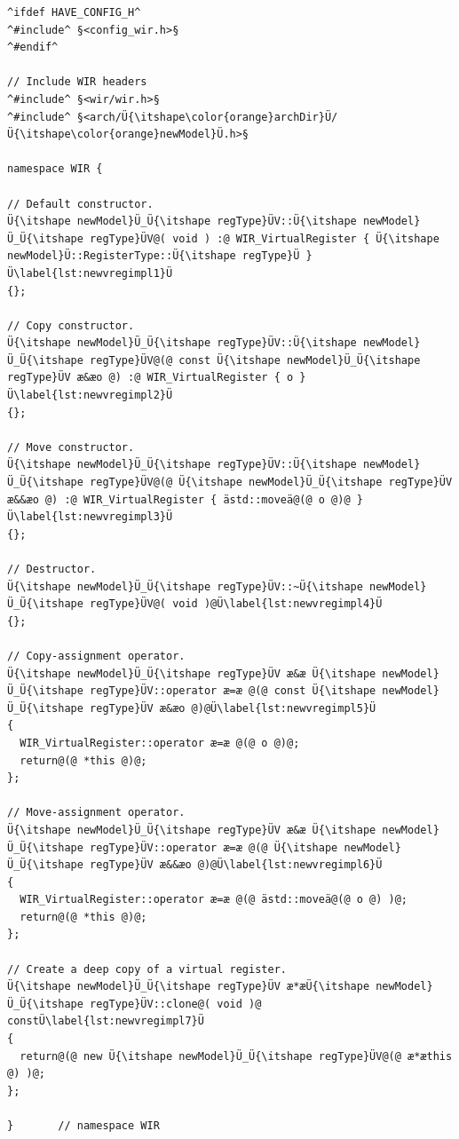 \begin{lstlisting}[style=code,float=!t,caption={Implementation of a New Virtual Register's Class},label=lst:newvregimpl]
^ifdef HAVE_CONFIG_H^
^#include^ §<config_wir.h>§
^#endif^

// Include WIR headers
^#include^ §<wir/wir.h>§
^#include^ §<arch/Ü{\itshape\color{orange}archDir}Ü/Ü{\itshape\color{orange}newModel}Ü.h>§

namespace WIR {

// Default constructor.
Ü{\itshape newModel}Ü_Ü{\itshape regType}ÜV::Ü{\itshape newModel}Ü_Ü{\itshape regType}ÜV@( void ) :@ WIR_VirtualRegister { Ü{\itshape newModel}Ü::RegisterType::Ü{\itshape regType}Ü }Ü\label{lst:newvregimpl1}Ü
{};

// Copy constructor.
Ü{\itshape newModel}Ü_Ü{\itshape regType}ÜV::Ü{\itshape newModel}Ü_Ü{\itshape regType}ÜV@(@ const Ü{\itshape newModel}Ü_Ü{\itshape regType}ÜV æ&æo @) :@ WIR_VirtualRegister { o }Ü\label{lst:newvregimpl2}Ü
{};

// Move constructor.
Ü{\itshape newModel}Ü_Ü{\itshape regType}ÜV::Ü{\itshape newModel}Ü_Ü{\itshape regType}ÜV@(@ Ü{\itshape newModel}Ü_Ü{\itshape regType}ÜV æ&&æo @) :@ WIR_VirtualRegister { ästd::moveä@(@ o @)@ }Ü\label{lst:newvregimpl3}Ü
{};

// Destructor.
Ü{\itshape newModel}Ü_Ü{\itshape regType}ÜV::~Ü{\itshape newModel}Ü_Ü{\itshape regType}ÜV@( void )@Ü\label{lst:newvregimpl4}Ü
{};

// Copy-assignment operator.
Ü{\itshape newModel}Ü_Ü{\itshape regType}ÜV æ&æ Ü{\itshape newModel}Ü_Ü{\itshape regType}ÜV::operator æ=æ @(@ const Ü{\itshape newModel}Ü_Ü{\itshape regType}ÜV æ&æo @)@Ü\label{lst:newvregimpl5}Ü
{
  WIR_VirtualRegister::operator æ=æ @(@ o @)@;
  return@(@ *this @)@;
};

// Move-assignment operator.
Ü{\itshape newModel}Ü_Ü{\itshape regType}ÜV æ&æ Ü{\itshape newModel}Ü_Ü{\itshape regType}ÜV::operator æ=æ @(@ Ü{\itshape newModel}Ü_Ü{\itshape regType}ÜV æ&&æo @)@Ü\label{lst:newvregimpl6}Ü
{
  WIR_VirtualRegister::operator æ=æ @(@ ästd::moveä@(@ o @) )@;
  return@(@ *this @)@;
};

// Create a deep copy of a virtual register.
Ü{\itshape newModel}Ü_Ü{\itshape regType}ÜV æ*æÜ{\itshape newModel}Ü_Ü{\itshape regType}ÜV::clone@( void )@ constÜ\label{lst:newvregimpl7}Ü
{
  return@(@ new Ü{\itshape newModel}Ü_Ü{\itshape regType}ÜV@(@ æ*æthis @) )@;
};

}       // namespace WIR
\end{lstlisting}

